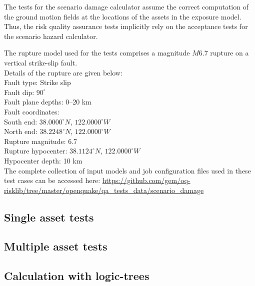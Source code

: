 The tests for the scenario damage calculator assume the correct computation of the ground motion fields at the locations of the assets in the exposure model. Thus, the risk quality assurance tests implicitly rely on the acceptance tests for the scenario hazard calculator.

The rupture model used for the tests comprises a magnitude $M6.7$ rupture on a vertical strike-slip fault.\\

\noindent Details of the rupture are given below:\\

\noindent
Fault type: Strike slip\\
Fault dip: $90^{\circ}$\\
Fault plane depths: 0--20 km\\
Fault coordinates:\\
South end: $38.0000^{\circ} N$, $122.0000^{\circ} W$\\
North end: $38.2248^{\circ} N$, $122.0000^{\circ} W$\\
Rupture magnitude: 6.7\\
Rupture hypocenter: $38.1124^{\circ} N$, $122.0000^{\circ} W$\\
Hypocenter depth: 10 km\\

The complete collection of input models and job configuration files used in these test cases can be accessed here:
\href{https://github.com/gem/oq-risklib/tree/master/openquake/qa_tests_data/scenario_damage}
{https://github.com/gem/oq-risklib/tree/master/openquake/qa\_tests\_data/scenario\_damage}

\subsection{Single asset tests}
\label{subsec:acc-scenario-damage-single}


\subsection{Multiple asset tests}
\label{subsec:acc-scenario-damage-multiple}


\subsection{Calculation with logic-trees}
\label{subsec:acc-scenario-damage-logictrees}

